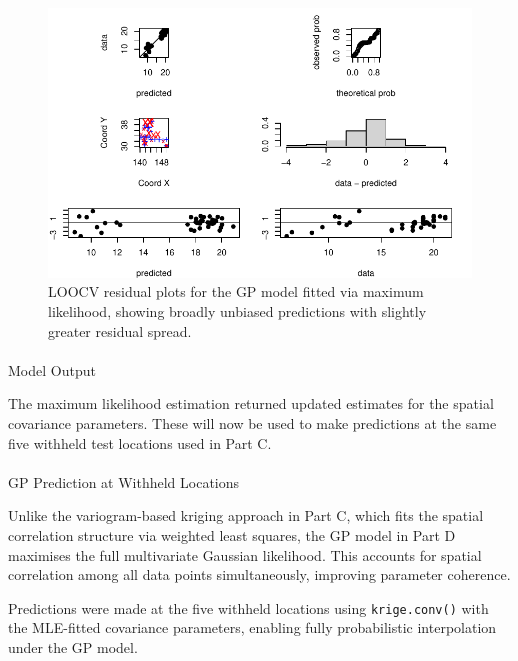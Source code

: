 \documentclass[
  11pt,
]{article}
\makeatletter
\let\oldparagraph\paragraph
\renewcommand{\paragraph}{
    \@ifstar
      \xxxParagraphStar
      \xxxParagraphNoStar
  }
\newcommand{\xxxParagraphStar}[1]{\oldparagraph*{#1}\mbox{}}
\newcommand{\xxxParagraphNoStar}[1]{\oldparagraph{#1}\mbox{}}
\makeatother
\begin{document}
\begin{figure}[H]

{\centering \includegraphics{project_files/figure-pdf/fig-cvgp-1.pdf}

}

\caption{LOOCV residual plots for the GP model fitted via maximum
likelihood, showing broadly unbiased predictions with slightly greater
residual spread.}

\end{figure}%

\paragraph{Model Output}\label{model-output}

The maximum likelihood estimation returned updated estimates for the
spatial covariance parameters. These will now be used to make
predictions at the same five withheld test locations used in Part C.

\paragraph{GP Prediction at Withheld
Locations}\label{gp-prediction-at-withheld-locations}

Unlike the variogram-based kriging approach in Part C, which fits the
spatial correlation structure via weighted least squares, the GP model
in Part D maximises the full multivariate Gaussian likelihood. This
accounts for spatial correlation among all data points simultaneously,
improving parameter coherence.

Predictions were made at the five withheld locations using
\texttt{krige.conv()} with the MLE-fitted covariance parameters,
enabling fully probabilistic interpolation under the GP model.
\end{document}
